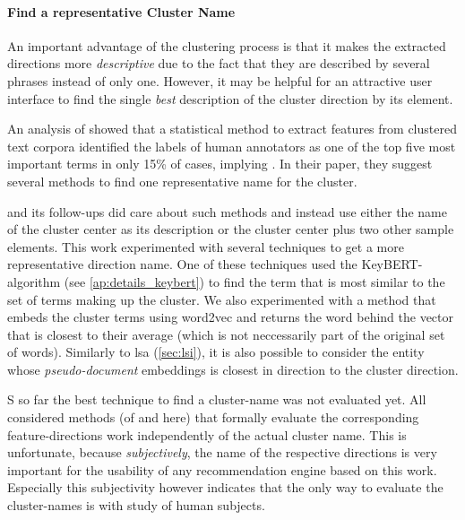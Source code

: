 \paragraph{Find a representative Cluster Name}

An important advantage of the clustering process is that it makes the extracted directions more \textit{descriptive} due to the fact that they are described by several phrases instead of only one. However, it may be helpful for an attractive user interface to find the single \textit{best} description of the cluster direction by its element.

An analysis of \cite{Carmel2009} showed that a statistical method to extract features from clustered text corpora identified the labels of human annotators as one of the top five most important terms in only 15\% of cases, implying  \cite[139]{Carmel2009}. In their paper, they suggest several methods to find one representative name for the cluster. 

\cite{Derrac2015} and its follow-ups \cite{Ager2018,Alshaikh2020} did care about such methods and instead use either the name of the cluster center as its description or the cluster center plus two other sample elements. This work experimented with several techniques to get a more representative direction name. One of these techniques used the KeyBERT-algorithm (see \autoref{ap:details_keybert}) to find the term that is most similar to the set of terms making up the cluster. We also experimented with a method that embeds the cluster terms using \gls{word2vec} and returns  the word behind the vector that is closest to their average (which is not neccessarily part of the original set of words). Similarly to \gls{lsa} (\autoref{sec:lsi}), it is also possible to consider the entity whose \textit{pseudo-document} embeddings is closest in direction to the cluster direction.

S so far the best technique to find a cluster-name was not evaluated yet. All considered methods (of \mainalgos and here) that formally evaluate the corresponding feature-directions work independently of the actual cluster name. This is unfortunate, because \textit{subjectively}, the name of the respective directions is very important for the usability of any recommendation engine based on this work. Especially this subjectivity however indicates that the only way to evaluate the cluster-names is with study of human subjects.

